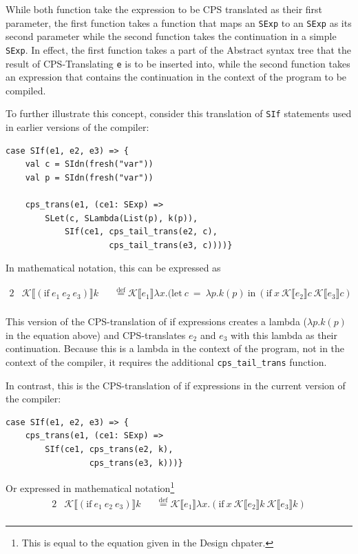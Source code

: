 \documentclass[11pt]{report}
\newcommand{\eqdef}{\stackrel{\text{def}}{=}}%
\newcommand{\cpstrans}[1]{\ensuremath{\mathcal{K}\llbracket #1 \rrbracket}}
\begin{document}
While both function take the expression to be CPS translated as their first parameter, the first function takes a function that maps an \texttt{SExp} to an \texttt{SExp} as its second parameter while the second function takes the continuation in a simple \texttt{SExp}. In effect, the first function takes a part of the Abstract syntax tree that the result of CPS-Translating \texttt{e} is to be inserted into, while the second function takes an expression that contains the continuation in the context of the program to be compiled.

To further illustrate this concept, consider this translation of \texttt{SIf} statements used in earlier versions of the compiler:

\begin{lstlisting}
case SIf(e1, e2, e3) => {
    val c = SIdn(fresh("var"))
    val p = SIdn(fresh("var"))
    
    cps_trans(e1, (ce1: SExp) =>
        SLet(c, SLambda(List(p), k(p)),
            SIf(ce1, cps_tail_trans(e2, c), 
                     cps_tail_trans(e3, c))))}
\end{lstlisting}

In mathematical notation, this can be expressed as

\begin{alignat*}{2}
&\cpstrans{(\text{if}\ e_1\ e_2\ e_3)} k &&\eqdef \cpstrans{e_1} \lambda x.(\text{let}~c~=~\lambda p.k(p)~\text{in}~(\text{if}\ x\ \cpstrans{e_2}c\ \cpstrans{e_3}c) \\
\end{alignat*}

This version of the CPS-translation of if expressions creates a lambda ($\lambda p.k(p)$ in the equation above) and CPS-translates $e_2$ and $e_3$ with this lambda as their continuation. Because this is a lambda in the context of the program, not in the context of the compiler, it requires the additional \texttt{cps_tail_trans} function.

In contrast, this is the CPS-translation of if expressions in the current version of the compiler:

\begin{lstlisting}
case SIf(e1, e2, e3) => {
    cps_trans(e1, (ce1: SExp) => 
        SIf(ce1, cps_trans(e2, k), 
                 cps_trans(e3, k)))}
\end{lstlisting}

Or expressed in mathematical notation\footnote{This is equal to the equation given in the Design chpater.}
\begin{alignat*}{2}
&\cpstrans{(\text{if}\ e_1\ e_2\ e_3)} k &&\eqdef \cpstrans{e_1} \lambda x.(\text{if}\ x\ \cpstrans{e_2}k\ \cpstrans{e_3}k) \\
\end{alignat*}
\end{document}
